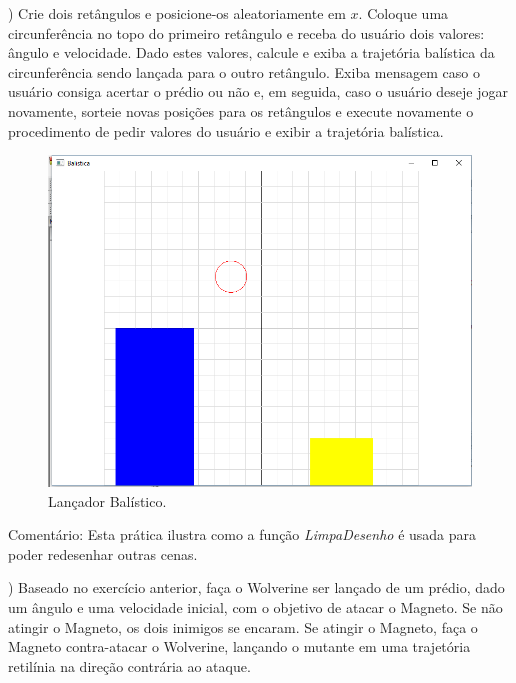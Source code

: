 \begin{renumerate}
\item)
Crie dois retângulos e posicione-os aleatoriamente em $x$. Coloque uma circunferência no topo do primeiro retângulo e receba do usuário dois valores: ângulo e velocidade. Dado estes valores, calcule e exiba a trajetória balística da circunferência sendo lançada para o outro retângulo. Exiba mensagem caso o usuário consiga acertar o prédio ou não e, em seguida, caso o usuário deseje jogar novamente, sorteie novas posições para os retângulos e execute novamente o procedimento de pedir valores do usuário e exibir a trajetória balística.

  \begin{figure}[ht]
    \centerline{\includegraphics[width=.25\textwidth]{img/cap3_ex12.png}}
    \caption{Lançador Balístico.}
    \label{fig:cap03_ex2}
  \end{figure}

 Comentário: Esta prática ilustra como a função \emph{LimpaDesenho} é usada para poder redesenhar outras cenas.
 \label{ex:cap03_ex1}
%

  \item)
  Baseado no exercício anterior, faça o Wolverine ser lançado de um prédio, dado um ângulo e uma velocidade inicial, com o objetivo de atacar o Magneto. Se não atingir o Magneto, os dois inimigos se encaram. Se atingir o Magneto, faça o Magneto contra-atacar o Wolverine, lançando o mutante em uma trajetória retilínia na direção contrária ao ataque.



\end{renumerate}

